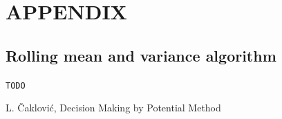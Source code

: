 \documentclass[letterpaper, 10 pt, conference]{ieeeconf}
\begin{document}
  \section*{APPENDIX}
  
  \subsection{Rolling mean and variance algorithm}
  \label{sub:rolling}
  
  \verb|TODO|

  \begin{thebibliography}{9} %
    
   L. \v{C}aklovi\'{c}, Decision Making by Potential Method

\end{thebibliography}
\end{document}
